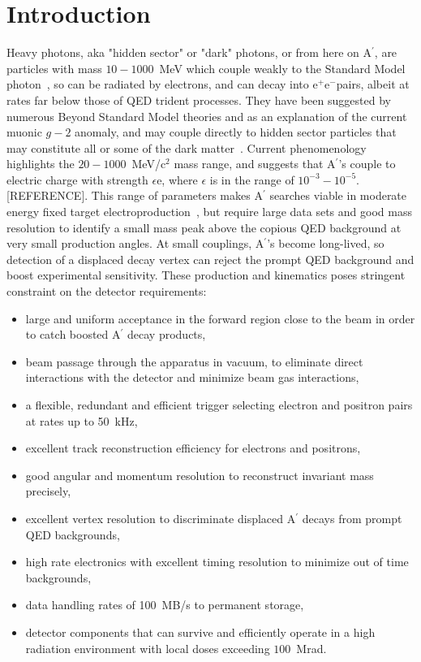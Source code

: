 \documentclass[final,3p,times,twocolumn]{elsarticle}
\newcommand{\Aprime}{A\ensuremath{^\prime}}
\newcommand{\ee}{e$^+$e$^-$}
\begin{document}
\section{Introduction}
\label{introduction}
Heavy photons, aka "hidden sector" or "dark" photons, or from here on \Aprime{}, are particles with 
mass $10-1000$~MeV 
which couple weakly to the Standard Model photon~\cite{Holdom:1985ag}, so can be radiated by 
electrons, and can decay 
into \ee pairs, albeit at rates far below those of QED trident processes. They have been suggested by 
numerous Beyond Standard Model theories and as an explanation of the current muonic $g-2$ 
anomaly, and may couple directly to hidden sector particles that may constitute all or some of the 
dark matter~\cite{ArkaniHamed:2008qn}. 
Current phenomenology highlights the $20-1000$~MeV/c$^{2}$ mass range, and 
suggests that \Aprime's couple to electric charge with strength $\epsilon$e, where 
$\epsilon$ is in the range of $10^{-3} -10^{-5}$. [REFERENCE]. This range of parameters makes 
\Aprime{} searches viable in moderate energy fixed target 
electroproduction~\cite{Bjorken:2009mm}, but require large data sets and good mass resolution
to identify a small mass peak above the copious QED background at very small production 
angles. At small couplings, \Aprime's become long-lived, so detection of a displaced decay 
vertex can reject the prompt QED background and boost experimental sensitivity.  These production 
and kinematics poses stringent constraint on the detector requirements:
\begin{itemize}
\item large and uniform acceptance in the forward region close to the beam in order to catch boosted 
\Aprime{} decay products,
\item beam passage through the apparatus in vacuum, to eliminate direct interactions with the 
detector and minimize beam gas interactions, 
\item a flexible, redundant and efficient trigger selecting electron and positron pairs at rates up to 
50~kHz,
\item excellent track reconstruction efficiency for electrons and positrons,
\item good angular and momentum resolution to reconstruct invariant mass precisely,
\item excellent vertex resolution to discriminate displaced \Aprime{} decays from prompt QED 
backgrounds,
\item high rate electronics with excellent timing resolution to minimize out of time backgrounds,
\item data handling rates of 100~MB/s to permanent storage,
\item detector components that can survive and efficiently operate in a high radiation environment 
with local doses exceeding $100$~Mrad.
\end{itemize}
\end{document}
